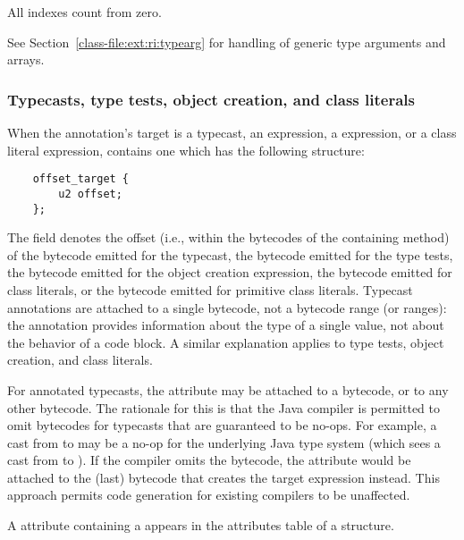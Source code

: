\documentclass[10pt]{article}
\begin{document}

All indexes count from zero.

See Section~\ref{class-file:ext:ri:typearg} for handling of generic
type arguments and arrays.



\subsubsection{Typecasts, type tests, object creation, and class literals\label{class-file:ext:ri:typecast}}

When the annotation's target is a typecast, an 
expression, a  expression, or a class literal expression,
 contains one  which has the
following structure:

\begin{Verbatim}
    offset_target {
        u2 offset;
    };
\end{Verbatim}

The  field denotes the offset (i.e., within the bytecodes
of the containing method) of the  bytecode emitted for
the typecast, the  bytecode emitted for the type tests,
the  bytecode emitted for the object creation expression,
the  bytecode emitted for class literals, or the
 bytecode emitted for primitive class literals.
Typecast annotations are attached to a single bytecode, not a bytecode range
(or ranges):  the annotation provides information about the type of a
single value, not about the behavior of a code block.
A similar explanation applies to type tests, object creation, and class literals.

For annotated typecasts, the attribute may be attached to a
 bytecode, or to any other bytecode.  The rationale for
this is that the Java compiler is permitted to omit 
bytecodes for typecasts that are guaranteed to be no-ops.  For example, a
cast from  to  may be a no-op for the
underlying Java type system (which sees a cast from  to
).  If the compiler omits the  bytecode, the
 attribute would be attached to the (last) bytecode that
creates the target expression instead.  This approach permits code
generation for existing compilers to be unaffected.

A \RuntimeInOrVisibleTypeAnnotations attribute containing a
 appears in the attributes table of a
 structure.
\end{document}
